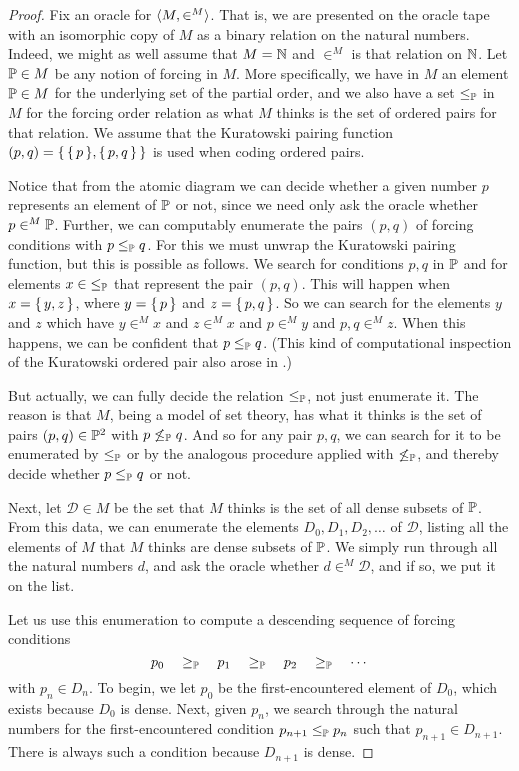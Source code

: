 \documentclass{amsart}
\begin{document}
\begin{proof}
Fix an oracle for $\<M,\in^M>$. That is, we are presented on the oracle tape with an isomorphic copy of $M$ as a binary relation on the natural numbers. Indeed, we might as well assume that $M=\N$ and $\in^M$ is that relation on $\N$. Let $\P\in M$ be any notion of forcing in $M$. More specifically, we have in $M$ an element $\P\in M$ for the underlying set of the partial order, and we also have a set $\leq_\P$ in $M$ for the forcing order relation as what $M$ thinks is the set of ordered pairs for that relation. We assume that the Kuratowski pairing function  $(p,q)=\set{\set{p},\set{p,q}}$ is used when coding ordered pairs.

Notice that from the atomic diagram we can decide whether a given number $p$ represents an element of $\P$ or not, since we need only ask the oracle whether $p\in^M\P$. Further, we can computably enumerate the pairs $(p,q)$ of forcing conditions with $p\leq_\P q$. For this we must unwrap the Kuratowski pairing function, but this is possible as follows. We search for conditions $p,q$ in $\P$ and for elements $x\in{\leq_\P}$ that represent the pair $(p,q)$. This will happen when $x=\set{y,z}$, where $y=\set{p}$ and $z=\set{p,q}$. So we can search for the elements $y$ and $z$ which have $y\in^M x$ and $z\in^M x$ and $p\in^M y$ and $p,q\in^M z$. When this happens, we can be confident that $p\leq_\P q$. (This kind of computational inspection of the Kuratowski ordered pair also arose in \cite{GodziszewskiHamkins2017:Computable-quotient-presentations-of-models-of-arithmetic-and-set-theory}.)

But actually, we can fully decide the relation $\leq_\P$, not just enumerate it. The reason is that $M$, being a model of set theory, has what it thinks is the set of pairs $(p,q)\in\P^2$ with $p\not\leq_\P q$. And so for any pair $p,q$, we can search for it to be enumerated by $\leq_\P$ or by the analogous procedure applied with $\not\leq_\P$, and thereby decide whether $p\leq_\P q$ or not.

Next, let $\mathcal{D}\in M$ be the set that $M$ thinks is the set of all dense subsets of $\P$. From this data, we can enumerate the elements $D_0,D_1,D_2,\ldots$ of $\mathcal{D}$, listing all the elements of $M$ that $M$ thinks are dense subsets of $\P$. We simply run through all the natural numbers $d$, and ask the oracle whether $d\in^M \mathcal{D}$, and if so, we put it on the list.

Let us use this enumeration to compute a descending sequence of forcing conditions
 $$p_0\quad\geq_\P\quad p_1\quad\geq_\P\quad p_2\quad\geq_\P\quad\cdots$$
with $p_n\in D_n$. To begin, we let $p_0$ be the first-encountered element of $D_0$, which exists because $D_0$ is dense. Next, given $p_n$, we search through the natural numbers for the first-encountered condition $p_{n+1}\leq_\P p_n$ such that $p_{n+1}\in D_{n+1}$. There is always such a condition because $D_{n+1}$ is dense.


\end{proof}
\end{document}
